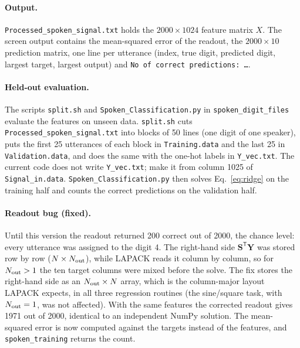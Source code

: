 \documentclass[11pt,a4paper]{report}
\begin{document}
\paragraph{Output.} \texttt{Processed\_\allowbreak spoken\_\allowbreak signal.txt} holds the $2000\times1024$ feature matrix $X$. The screen output contains the mean-squared error of the readout, the $2000\times10$ prediction matrix, one line per utterance (index, true digit, predicted digit, largest target, largest output) and \texttt{No of correct predictions: \dots}.

\paragraph{Held-out evaluation.} The scripts \texttt{split.sh} and \texttt{Spoken\_\allowbreak Classification.py} in \texttt{spoken\_\allowbreak digit\_\allowbreak files} evaluate the features on unseen data. \texttt{split.sh} cuts \texttt{Processed\_\allowbreak spoken\_\allowbreak signal.txt} into blocks of 50 lines (one digit of one speaker), puts the first 25 utterances of each block in \texttt{Training.data} and the last 25 in \texttt{Validation.data}, and does the same with the one-hot labels in \texttt{Y\_vec.txt}. The current code does not write \texttt{Y\_vec.txt}; make it from column 1025 of \texttt{Signal\_in.data}. \texttt{Spoken\_\allowbreak Classification.py} then solves Eq.~\eqref{eq:ridge} on the training half and counts the correct predictions on the validation half.

\paragraph{Readout bug (fixed).} Until this version the readout returned 200 correct out of 2000, the chance level: every utterance was assigned to the digit 4. The right-hand side $\mathbf S^{\mathsf T}\mathbf Y$ was stored row by row ($N\times N_{\rm out}$), while LAPACK reads it column by column, so for $N_{\rm out}>1$ the ten target columns were mixed before the solve. The fix stores the right-hand side as an $N_{\rm out}\times N$ array, which is the column-major layout LAPACK expects, in all three regression routines (the sine/square task, with $N_{\rm out}=1$, was not affected). With the same features the corrected readout gives 1971 out of 2000, identical to an independent NumPy solution. The mean-squared error is now computed against the targets instead of the features, and \texttt{spoken\_training} returns the count.
\end{document}
